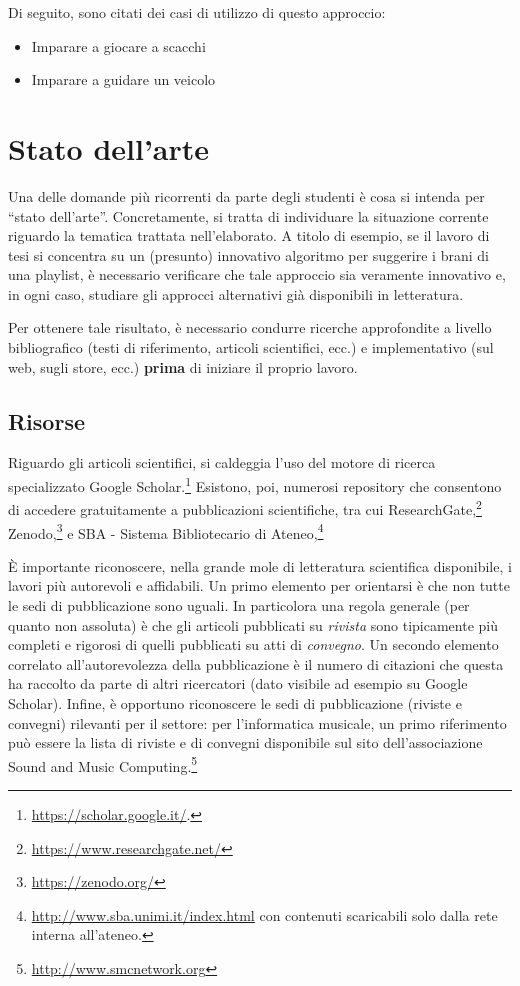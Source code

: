 \documentclass[12pt,italian]{report}
\begin{document}
Di seguito, sono citati dei casi di utilizzo di questo approccio:

\begin{itemize}
	\item Imparare a giocare a scacchi
	\item Imparare a guidare un veicolo
\end{itemize}

% 
% 

\chapter{Stato dell'arte}
\label{chap:stato_arte}


Una delle domande più ricorrenti da parte degli studenti \`e cosa si intenda per ``stato dell'arte''. Concretamente, si tratta di individuare la situazione corrente riguardo la tematica trattata nell'elaborato. A titolo di esempio, se il lavoro di tesi si concentra su un (presunto) innovativo algoritmo per suggerire i brani di una playlist, è necessario verificare che tale approccio sia veramente innovativo e, in ogni caso, studiare gli approcci alternativi già disponibili in letteratura.

Per ottenere tale risultato, è necessario condurre ricerche approfondite a livello bibliografico (testi di riferimento, articoli scientifici, ecc.) e implementativo (sul web, sugli store, ecc.) \textbf{prima} di iniziare il proprio lavoro.

\section{Risorse}

Riguardo gli articoli scientifici, si caldeggia l'uso del motore di ricerca specializzato Google Scholar.\footnote{\url{https://scholar.google.it/}.} Esistono, poi, numerosi repository che consentono di accedere gratuitamente a pubblicazioni scientifiche, tra cui ResearchGate,\footnote{\url{https://www.researchgate.net/}} Zenodo,\footnote{\url{https://zenodo.org/}} e SBA - Sistema Bibliotecario di Ateneo,\footnote{\url{http://www.sba.unimi.it/index.html} con contenuti scaricabili solo dalla rete interna all'ateneo.}

\`E importante riconoscere, nella grande mole di letteratura scientifica disponibile, i lavori pi\`u autorevoli e affidabili. Un primo elemento per orientarsi \`e che non tutte le sedi di pubblicazione sono uguali. In particolora una regola generale (per quanto non assoluta) \`e che gli articoli pubblicati su {\em rivista} sono tipicamente pi\`u completi e rigorosi di quelli pubblicati su atti di {\em convegno}. Un secondo elemento correlato all'autorevolezza della pubblicazione \`e il numero di citazioni che questa ha raccolto da parte di altri ricercatori (dato visibile ad esempio su Google Scholar). Infine, \`e opportuno riconoscere le sedi di pubblicazione (riviste e convegni) rilevanti per il settore: per l'informatica musicale, un primo riferimento pu\`o essere la lista di riviste e di convegni disponibile sul sito dell'associazione Sound and Music Computing.\footnote{\url{http://www.smcnetwork.org}}
\end{document}
